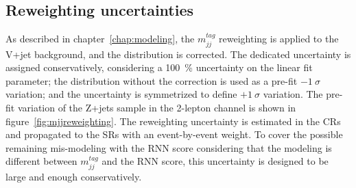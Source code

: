 \subsection{Reweighting uncertainties}
As described in chapter~\ref{chap:modeling}, the $m^{tag}_{jj}$ reweighting is applied to the V+jet background, and the distribution is corrected. 
The dedicated uncertainty is assigned conservatively, considering a 100~\% uncertainty on the linear fit parameter; the distribution without the correction is used as a pre-fit $-1~\sigma$ variation; and the uncertainty is symmetrized to define $+1~\sigma$ variation. 
The pre-fit variation of the Z+jets sample in the 2-lepton channel is shown in figure~\ref{fig:mjjreweighting}.
The reweighting uncertainty is estimated in the CRs and propagated to the SRs with an event-by-event weight. 
To cover the possible remaining mis-modeling with the RNN score considering that the modeling is different between $m^{tag}_{jj}$ and the RNN score, this uncertainty is designed to be large and enough conservatively.
